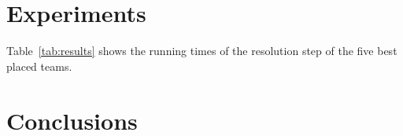 \documentclass[sigconf]{acmart}
\begin{document}
\section{Experiments}

Table~\ref{tab:results} shows the running times of the resolution step of the five best placed teams.


\begin{table}[htbp]
  \caption{Comparison of the F-measure and the running times of the resolution step of the five best placed teams. The input data for the resolution step consisted of 29{,}787 in JSON formatted e-commerce websites. Measurements were taken on a
laptop running Ubuntu 19.04 with 16 GB of RAM and two Intel Core i5-4310U CPUs. The underlying SSD was a 500\,GB 860 EVO mSATA. We cleared the page cache, dentries, and inodes before each run to avoid reading the input data from RAM instead of the SSD.}
  \label{tab:results}
\end{table}


\section{Conclusions}



\end{document}
